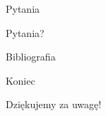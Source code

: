 \begin{frame}{Pytania}
    \begin{center}
        {\huge Pytania?}
    \end{center}
\end{frame}

\begin{frame}[allowframebreaks]{Bibliografia}
    \printbibliography
\end{frame}

\begin{frame}{Koniec}
    \begin{center}
        {\huge Dziękujemy za uwagę!}
    \end{center}
\end{frame}

\pglastframe